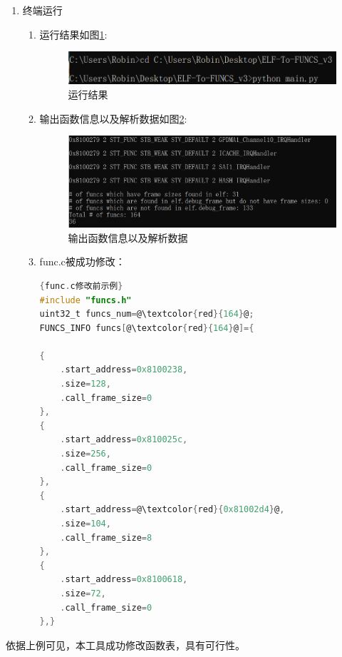 \documentclass[UTF8,12pt,a4paper]{ctexart}
\numberwithin{figure}{section}
\begin{document}
\begin{enumerate}
\begin{enumerate}
          \end{enumerate}
    \item 终端运行
          \begin{enumerate}
              \item 运行结果如图\ref{yx}:
                    \begin{figure}[H]
                        \centering
                        \includegraphics[scale=0.5]{graph/zhongduanjieguo.png}
                        \caption{运行结果}
                        \label{yx}
                    \end{figure}
              \item 输出函数信息以及解析数据如图\ref{sc}:
                    \begin{figure}[H]
                        \centering
                        \includegraphics[scale=0.3]{graph/shuchujieguo.png}
                        \caption{输出函数信息以及解析数据}
                        \label{sc}
                    \end{figure}
              \item func.c被成功修改：
                    \begin{lstlisting}[language=C]{func.c修改前示例}
#include "funcs.h"
uint32_t funcs_num=@\textcolor{red}{164}@;
FUNCS_INFO funcs[@\textcolor{red}{164}@]={

{
    .start_address=0x8100238,
    .size=128,
    .call_frame_size=0
},
{
    .start_address=0x810025c,
    .size=256,
    .call_frame_size=0
},
{
    .start_address=@\textcolor{red}{0x81002d4}@,
    .size=104,
    .call_frame_size=8
},
{
    .start_address=0x8100618,
    .size=72,
    .call_frame_size=0
},}
                    \end{lstlisting}
                    
                    
                    
          \end{enumerate}
\end{enumerate}
\par 依据上例可见，本工具成功修改函数表，具有可行性。
\end{document}
